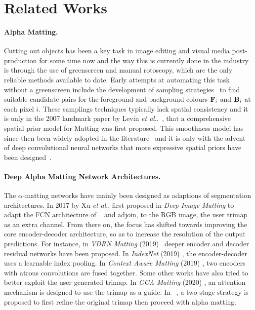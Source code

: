 \documentclass[runningheads]{llncs}
\makeatletter
\DeclareRobustCommand\onedot{\futurelet\@let@token\@onedot}
\def\@onedot{\ifx\@let@token.\else.\null\fi\xspace}
\def\etal{\emph{et al}\onedot}
\makeatother
\begin{document}
\section{Related Works}\label{sec:related-works}

\paragraph{Alpha Matting.}

Cutting out objects has been a key task in image editing and visual media
post-production for some time now and the way this is currently done in the
industry is through the use of greenscreen and manual rotoscopy, which are the
only reliable methods available to date. Early attempts at automating this task
without a greenscreen include the development of sampling
strategies~\cite{sharedMatting,comprehensiveSamplingMatting,klDivergenceMatting}
to find suitable candidate pairs for the foreground and background colours $\mathbf{{{F}}}_i$
and $\mathbf{{{B}}}_i$ at each pixel $i$. These samplings techniques typically lack spatial
consistency and it is only in the 2007 landmark paper by Levin
\etal~\cite{ClosedFormMattingPAMI}, that a comprehensive spatial prior model for
Matting was first proposed. This smoothness model has since then been widely
adopted in the literature~\cite{He11,Shahrian13,karacan2017alpha} and it is only
with the advent of deep convolutional neural networks that more expressive
spatial priors have been designed~\cite{DeepImageMatting,IndexMatting}.

\paragraph{Deep Alpha Matting Network Architectures.}

The $\alpha$-matting networks have mainly been designed as adaptions of
segmentation architectures. In 2017 by Xu \etal \cite{DeepImageMatting} first
proposed in \textit{Deep Image Matting} to adapt the FCN architecture of
~\cite{FCN} and adjoin, to the RGB image, the user trimap as an
extra channel. From there on, the focus has shifted towards improving the core
encoder-decoder architecture, so as to increase the resolution of the output
predictions. For instance, in \textit{VDRN Matting} (2019)~\cite{VDRNMatting}
deeper encoder and decoder residual networks have been proposed. In
\textit{IndexNet} (2019) \cite{IndexMatting}, the encoder-decoder uses a
learnable index pooling. In \textit{Context Aware Matting} (2019)
\cite{ContextMatting}, two encoders with atrous convolutions are fused
together. Some other works have also tried to better exploit the user
generated trimap. In \textit{GCA Matting} (2020) \cite{GCAMatting}, an attention
mechanism is designed to use the trimap as a guide. In ~\cite{DisentangledMatting}, a two stage strategy is proposed to first refine the original trimap then proceed with alpha matting.
\end{document}
